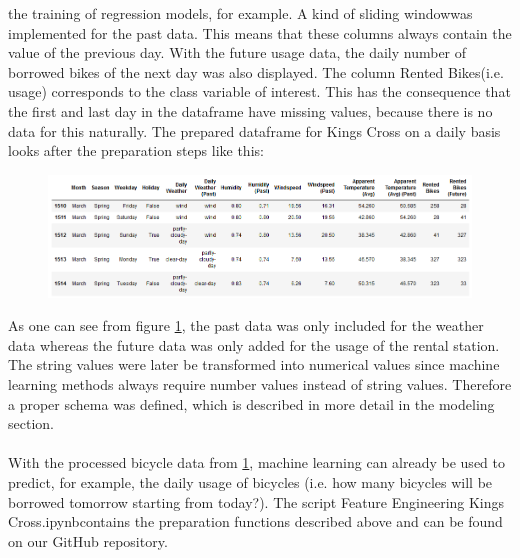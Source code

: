 the training of regression models, for example. A kind of \glqq sliding window\grqq was implemented for
the past data. This means that these columns always contain the value of the previous day. With
the future usage data, the daily number of borrowed bikes of the next day was also displayed. The
column \glqq Rented Bikes\grqq (i.e. usage) corresponds to the class variable of interest. This has the
consequence that the first and last day in the dataframe have missing values, because there is no
data for this naturally. The prepared dataframe for Kings Cross on a daily basis looks after the
preparation steps like this:
\begin{figure}[H]
\hspace{-2.8cm}
\includegraphics[width=1.4\textwidth]{img/figure6_kings_cross_df}\label{fig:figure6_kings_cross_df}
\label{fig:figure6_kings_cross_df}
\end{figure}
As one can see from figure \ref{fig:figure6_kings_cross_df}, the past data was only included for the weather data whereas the
future data was only added for the usage of the rental station. The string values were later be
transformed into numerical values since machine learning methods always require number values
instead of string values. Therefore a proper schema was defined, which is described in more detail
in the modeling section.\\\\
With the processed bicycle data from \ref{fig:figure6_kings_cross_df}, machine learning can already be used to predict,
for example, the daily usage of bicycles (i.e. how many bicycles will be borrowed tomorrow starting
from today?). The script \glqq Feature Engineering Kings Cross.ipynb\grqq contains the preparation
functions described above and can be found on our GitHub repository.
